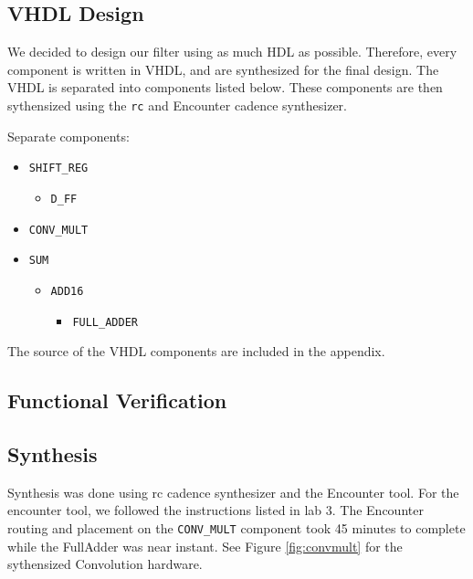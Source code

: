 \subsection{VHDL Design}
We decided to design our filter using as much HDL as possible.  Therefore, every component is written in VHDL, and are synthesized for the final design. The VHDL is separated into components listed below.  These components are then sythensized using the \texttt{rc} and Encounter cadence synthesizer.  

Separate components:
\begin{itemize}
\item \verb=SHIFT_REG=
	\begin{itemize}
		\item \verb=D_FF=
	\end{itemize}
\item \verb=CONV_MULT=
\item \verb=SUM=
	\begin{itemize}
		\item \verb=ADD16=
		\begin{itemize}
			\item \verb=FULL_ADDER=
		\end{itemize}
	\end{itemize}
\end{itemize}

The source of the VHDL components are included in the appendix.  

\subsection{Functional Verification}



\subsection{Synthesis}
Synthesis was done using rc cadence synthesizer and the Encounter tool.  For the encounter tool, we followed the instructions listed in lab 3.  The Encounter routing and placement on the \verb=CONV_MULT= component took 45 minutes to complete while the FullAdder was near instant.  See Figure \ref{fig:convmult} for the sythensized Convolution hardware.

